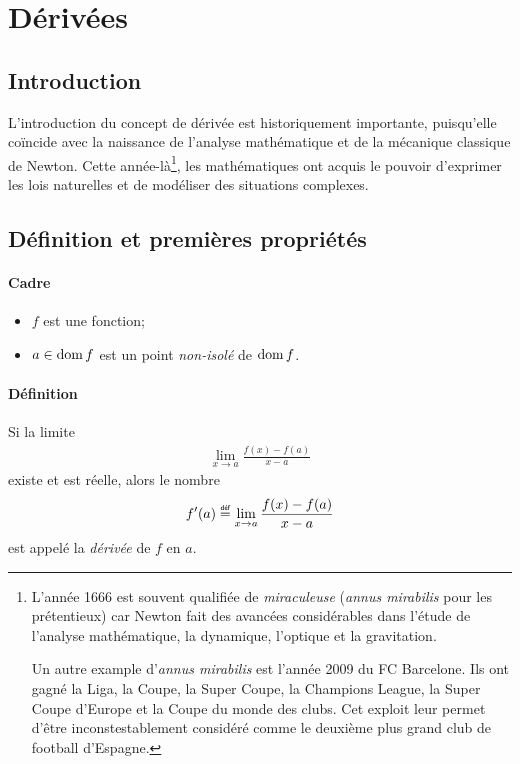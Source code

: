 \documentclass[main.tex]{subfiles}
\begin{document}
\chapter{Dérivées}

\section{Introduction}

L'introduction du concept de dérivée est historiquement importante,
puisqu'elle coïncide avec la naissance de l'analyse mathématique et de la mécanique classique de Newton.
Cette année-là\footnote{%
    L'année 1666 est souvent qualifiée de \emph{miraculeuse} (\emph{annus mirabilis} pour les prétentieux)
    car Newton fait des avancées considérables dans l'étude de 
    l'analyse mathématique, la dynamique, l'optique et la gravitation.

    Un autre example d'\emph{annus mirabilis} est l'année 2009 du FC Barcelone.
    Ils ont gagné la Liga, la Coupe, la Super Coupe, la Champions League, la Super Coupe d'Europe et la Coupe du monde des clubs.
    Cet exploit leur permet d'être inconstestablement considéré comme le deuxième plus grand club de football d'Espagne.
},
les mathématiques ont acquis le pouvoir d'exprimer les lois naturelles et de modéliser des situations complexes.

\section{Définition et premières propriétés}

\begin{definition}
    [Dérivée]

    \subsubsection*{Cadre}

    \begin{itemize}
        \item $f$ est une fonction;
        \item $a \in \operatorname{dom} f$ est un point \emph{non-isolé} de $\operatorname{dom} f$.
    \end{itemize}

    \subsubsection*{Définition}

    Si la limite
    \begin{align}
        \lim_{x \to a} \frac {f(x) - f(a)} {x - a}
    \end{align}
    existe et est réelle,
    alors le nombre
    \begin{align}
        f'(a) \defeq \lim_{x \to a} \frac {f(x) - f(a)} {x - a}
    \end{align}
    est appelé la \emph{dérivée} de $f$ en $a$.
\end{definition}
\end{document}
